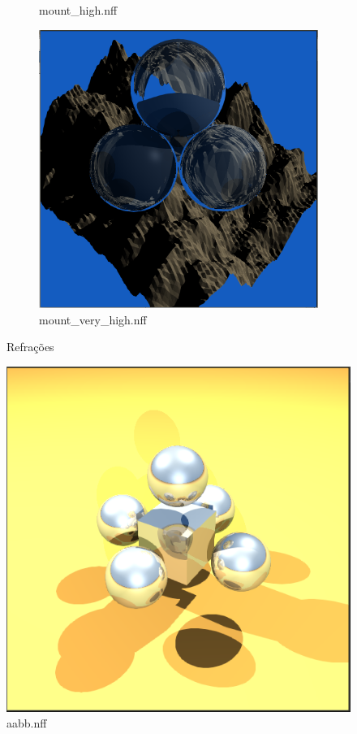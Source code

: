 \documentclass{article}
\begin{document}
\begin{figure}[h!]
\begin{subfigure}[b]{.2\linewidth}
            \caption{mount\_high.nff}
            \label{fig:mount_high}
        \end{subfigure}
        \begin{subfigure}[b]{.2\linewidth}
            \includegraphics[width=\linewidth]{mount_very_high.png}
            \caption{mount\_very\_high.nff}
            \label{fig:mount_very_high}
        \end{subfigure}

        \caption{Refrações}
        \label{fig:balls}
    \end{figure}

    \begin{figure}[h!]
        \centering
        \includegraphics[width=.2\linewidth]{aabb.png}
        \caption{aabb.nff}
        \label{fig:aabb}
    \end{figure}
\end{document}
